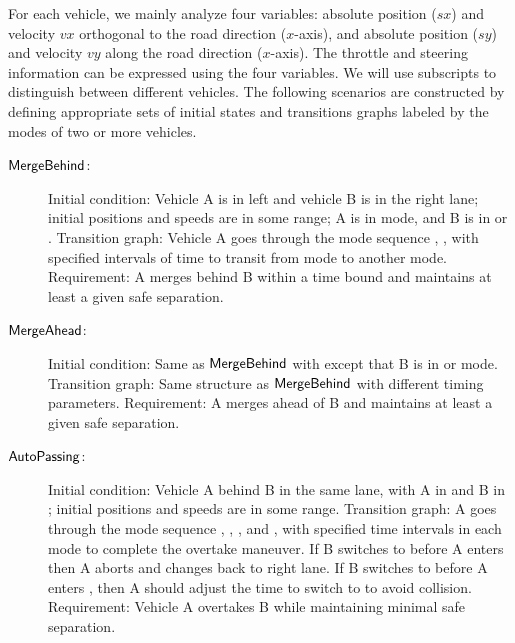 For each vehicle, we mainly analyze four variables: absolute position
($sx$) and velocity $vx$ orthogonal to the road direction ($x$-axis),
and absolute position ($sy$) and velocity $vy$ along the road
direction ($x$-axis). The throttle and steering information can be
expressed using the four variables. We will use subscripts to
distinguish between different vehicles.  The following scenarios are
constructed by defining appropriate sets of initial states and
transitions graphs labeled by the modes of two or more vehicles.
%
\begin{description} 
	\item[${\operatorname{\mathsf{MergeBehind}}}$:] 
	Initial condition:  Vehicle A is in left and  vehicle B is in the right lane; initial positions and speeds are in some range;  A is in  mode, and B is in  or .
	Transition graph:  Vehicle A  goes through the mode sequence , ,  with specified intervals of time to transit from mode to another mode. 
	Requirement: A merges behind B within a time bound and maintains at least a given safe separation.
	\item[${\operatorname{\mathsf{MergeAhead}}}$:] 
	Initial condition: Same as  ${\operatorname{\mathsf{MergeBehind}}}$ with 
	except that B is in  or  mode.
	Transition graph: Same structure as  ${\operatorname{\mathsf{MergeBehind}}}$ with different  timing parameters.
	Requirement: A merges ahead of B and maintains at least a given safe separation. 
	\item[${\operatorname{\mathsf{AutoPassing}}}$:]
	Initial condition: Vehicle A behind  B in the same lane, with A in  and B in ; initial positions and speeds are in some range.
	Transition graph:  A goes through the mode sequence , , , and  ,  with specified time intervals in each mode to complete the overtake maneuver. If B switches to
	 before A enters  then
	A aborts and changes back to right lane. If B switches to  before A enters , then A should adjust the time to switch to  to avoid collision.
	Requirement: Vehicle A overtakes B while maintaining minimal safe separation.
	

\end{description}
